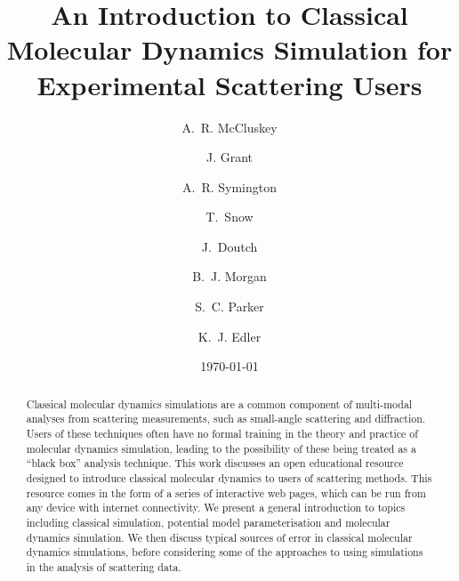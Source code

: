 \documentclass[amsmath,amssymb,twocolumn,superscriptaddress]{revtex4-1}
\begin{document}

\title{An Introduction to Classical Molecular Dynamics Simulation for Experimental Scattering Users}

\author{A.~R. McCluskey}

\author{J. Grant}

\author{A.~R. Symington}

\author{T.~Snow}

\author{J.~Doutch}

\author{B.~J. Morgan}

\author{S.~C. Parker}

\author{K.~J. Edler}

\date{\today}

\begin{abstract}
\noindent Classical molecular dynamics simulations are a common component of multi-modal analyses from scattering measurements, such as small-angle scattering and diffraction.
Users of these techniques often have no formal training in the theory and practice of molecular dynamics simulation, leading to the possibility of these being treated as a ``black box'' analysis technique.
This work discusses an open educational resource designed to introduce classical molecular dynamics to users of scattering methods.
This resource comes in the form of a series of interactive web pages, which can be run from any device with internet connectivity.
We present a general introduction to topics including classical simulation, potential model parameterisation and molecular dynamics simulation.
We then discuss typical sources of error in classical molecular dynamics simulations, before considering some of the approaches to using simulations in the analysis of scattering data.
\end{abstract}
\end{document}
